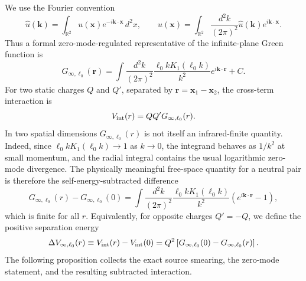 \documentclass[nopacs,amsmath,amsfonts,amssymb,aps,superscriptaddress]{revtex4}
\begin{document}
We use the Fourier convention
\begin{equation}
  \widehat u(\mathbf k)=\int_{\mathbb R^2}u(\mathbf x)e^{-i\mathbf k\cdot\mathbf x}\,d^2x,
  \qquad
  u(\mathbf x)=\int_{\mathbb R^2}\frac{d^2k}{(2\pi)^2}\widehat u(\mathbf k)e^{i\mathbf k\cdot\mathbf x}.
\end{equation}
Thus a formal zero-mode-regulated representative of the infinite-plane Green function is
\begin{equation}
  G_{\infty,\ell_0}(\mathbf r)
  =\int\frac{d^2 k}{(2\pi)^2}\frac{\ell_0 k K_1(\ell_0 k)}{k^2}e^{i\mathbf k\cdot \mathbf r}+C.
\end{equation}
For two static charges $Q$ and $Q'$, separated by $\mathbf r=\mathbf x_1-\mathbf x_2$, the cross-term interaction is
\begin{equation}
  V_{\rm int}(r)=Q Q' G_{\infty,\ell_0}(r).
\end{equation}
In two spatial dimensions $G_{\infty,\ell_0}(r)$ is not itself an infrared-finite quantity. Indeed, since $\ell_0 k K_1(\ell_0 k)\to 1$ as $k\to 0$, the integrand behaves as $1/k^2$ at small momentum, and the radial integral contains the usual logarithmic zero-mode divergence. The physically meaningful free-space quantity for a neutral pair is therefore the self-energy-subtracted difference
\begin{equation}
  G_{\infty,\ell_0}(r)-G_{\infty,\ell_0}(0)
  =\int\frac{d^2 k}{(2\pi)^2}\frac{\ell_0 k K_1(\ell_0 k)}{k^2}
  \left(e^{i\mathbf k\cdot\mathbf r}-1\right),
\end{equation}
which is finite for all $r$. Equivalently, for opposite charges $Q'=-Q$, we define the positive separation energy
\begin{equation}
  \Delta V_{\infty,\ell_0}(r)
  \equiv V_{\rm int}(r)-V_{\rm int}(0)
  =Q^2\left[G_{\infty,\ell_0}(0)-G_{\infty,\ell_0}(r)\right].
\end{equation}
The following proposition collects the exact source smearing, the zero-mode statement, and the resulting subtracted interaction.
\end{document}
